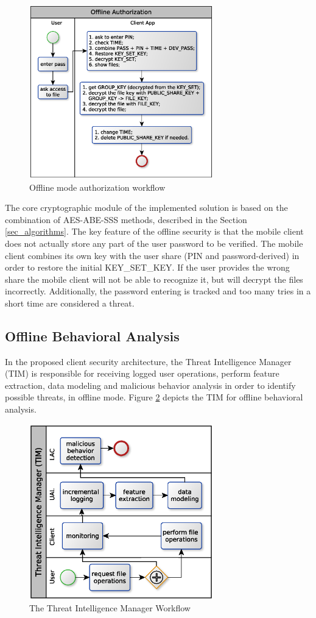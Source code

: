 \documentclass[twocolumn]{svjour3}          	%
\begin{document}
\begin{figure}[h!]
	\centering
	\includegraphics[width=8cm]{figures/offlineauthorizationworkflow.eps}
	\caption{Offline mode authorization workflow}
	\label{fig:7}
\end{figure}

The core cryptographic module of the implemented solution is based on the combination of AES-ABE-SSS methods, described in the Section \ref{sec_algorithms}. The key feature of the offline security is that the mobile client does not actually store any part of the user password to be verified. The mobile client combines its own key with the user share (PIN and password-derived) in order to restore the initial KEY\_SET\_KEY. If the user provides the wrong share the mobile client will not be able to recognize it, but will decrypt the files incorrectly. Additionally, the password entering is tracked and too many tries in a short time are considered a threat.

\subsection{Offline Behavioral Analysis}
\label{sec_offline_behavioral_analysis}

In the proposed client security architecture, the Threat Intelligence Manager (TIM) is responsible for receiving logged user operations, perform feature extraction, data modeling and malicious behavior analysis in order to identify possible threats, in offline mode. Figure \ref{fig:8} depicts the TIM for offline behavioral analysis. 

\begin{figure}[h!]
	\centering
	\includegraphics[width=8cm]{figures/mosworkflow.eps}
	\caption{The Threat Intelligence Manager Workflow}
	\label{fig:8}
\end{figure}
\end{document}
